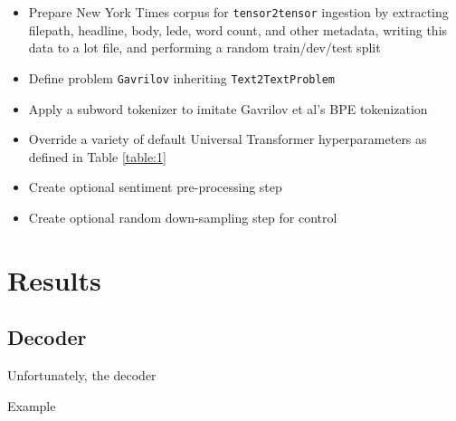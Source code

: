 \documentclass[11pt]{article}
\begin{document}
\begin{itemize}
    \item Prepare New York Times corpus for \texttt{tensor2tensor} ingestion by extracting filepath, headline, body, lede, word count, and other metadata, writing this data to a lot file, and performing a random train/dev/test split
    \item Define problem \texttt{Gavrilov} inheriting \texttt{Text2TextProblem}
    \item Apply a subword tokenizer to imitate Gavrilov et al's BPE tokenization
    \item Override a variety of default Universal Transformer hyperparameters as defined in Table \ref{table:1}
    \item Create optional sentiment pre-processing step
    \item Create optional random down-sampling step for control
\end{itemize}

\section{Results}
\subsection{Decoder}

Unfortunately, the decoder 

Example
\end{document}
